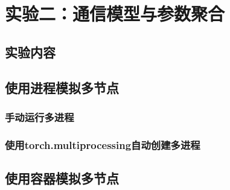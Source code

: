 \chapter{实验二：通信模型与参数聚合}

\section{实验内容}

\section{使用进程模拟多节点}

\subsection{手动运行多进程}
\subsection{使用torch.multiprocessing自动创建多进程}

\section{使用容器模拟多节点}

